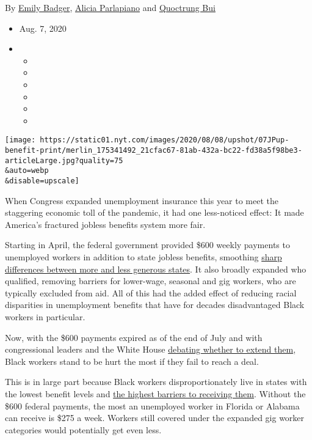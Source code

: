 By \href{https://www.nytimes.com/by/emily-badger}{Emily Badger},
\href{https://www.nytimes.com/by/alicia-parlapiano}{Alicia Parlapiano}
and \href{https://www.nytimes.com/by/quoctrung-bui}{Quoctrung Bui}

\begin{itemize}
\item
  Aug. 7, 2020
\item
  \begin{itemize}
  \item
  \item
  \item
  \item
  \item
  \item
  \end{itemize}
\end{itemize}

\texttt{[image: https://static01.nyt.com/images/2020/08/08/upshot/07JPup-benefit-print/merlin\_175341492\_21cfac67-81ab-432a-bc22-fd38a5f98be3-articleLarge.jpg?quality=75\\\&auto=webp\\\&disable=upscale]}

When Congress expanded unemployment insurance this year to meet the
staggering economic toll of the pandemic, it had one less-noticed
effect: It made America's fractured jobless benefits system more fair.

Starting in April, the federal government provided \$600 weekly payments
to unemployed workers in addition to state jobless benefits, smoothing
\href{https://www.nytimes.com/interactive/2020/04/23/business/economy/unemployment-benefits-stimulus-coronavirus.html}{sharp
differences between more and less generous states}. It also broadly
expanded who qualified, removing barriers for lower-wage, seasonal and
gig workers, who are typically excluded from aid. All of this had the
added effect of reducing racial disparities in unemployment benefits
that have for decades disadvantaged Black workers in particular.

Now, with the \$600 payments expired as of the end of July and with
congressional leaders and the White House
\href{https://www.nytimes.com/2020/08/05/us/politics/mcconnell-stimulus-talks-coronavirus.html?action=click\&module=Top\%20Stories\&pgtype=Homepage}{debating
whether to extend them}, Black workers stand to be hurt the most if they
fail to reach a deal.

This is in large part because Black workers disproportionately live in
states with the lowest benefit levels and
\href{https://www.nytimes.com/2020/04/30/upshot/unemployment-state-restrictions-pandemic.html}{the
highest barriers to receiving them}. Without the \$600 federal payments,
the most an unemployed worker in Florida or Alabama can receive is \$275
a week. Workers still covered under the expanded gig worker categories
would potentially get even less.

